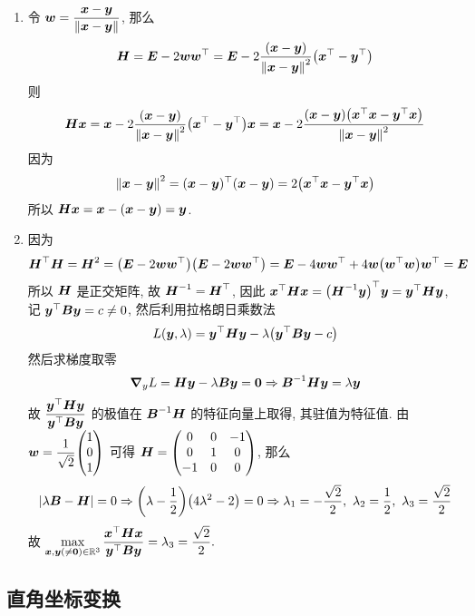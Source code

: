 \begin{solution}
  \begin{enumerate}[label=(\arabic{*})]
    \item 令 $\vb*{w}=\dfrac{\vb*{x}-\vb*{y}}{\norm{\vb*{x}-\vb*{y}}}$, 那么 $$
    \vb*{H}=\vb*{E}-2\vb*{ww}^\top=\vb*{E}-2\dfrac{(\vb*{x}-\vb*{y})}{\norm{\vb*{x}-\vb*{y}}^2}\qty(\vb*{x}^\top-\vb*{y}^\top)
    $$
    则 $$
    \vb*{Hx}=\vb*{x}-2\dfrac{(\vb*{x}-\vb*{y})}{\norm{\vb*{x}-\vb*{y}}^2}\qty(\vb*{x}^\top-\vb*{y}^\top)\vb*{x}=\vb*{x}-2\dfrac{(\vb*{x}-\vb*{y})\qty(\vb*{x}^\top\vb*{x}-\vb*{y}^\top\vb*{x})}{\norm{\vb*{x}-\vb*{y}}^2}
    $$
    因为 $$
    \norm{\vb*{x}-\vb*{y}}^2=(\vb*{x}-\vb*{y})^\top(\vb*{x}-\vb*{y})=2\qty(\vb*{x}^\top\vb*{x}-\vb*{y}^\top\vb*{x})
    $$
    所以 $\vb*{Hx}=\vb*{x}-(\vb*{x}-\vb*{y})=\vb*{y}$.
    \item 因为 $$\vb*{H}^\top\vb*{H}=\vb*{H}^2=\qty(\vb*{E}-2\vb*{ww}^\top)\qty(\vb*{E}-2\vb*{ww}^\top)=\vb*{E}-4\vb*{ww}^\top+4\vb*{w}\qty(\vb*{w}^\top\vb*{w})\vb*{w}^\top=\vb*{E}$$ 所以 $\vb*{H}$ 是正交矩阵, 故 $\vb*{H}^{-1}=\vb*{H}^\top$, 因此
     $\vb*{x}^\top\vb*{Hx}=\qty(\vb*{H}^{-1}\vb*{y})^\top\vb*{y}=\vb*{y}^\top\vb*{Hy}$, 记 $\vb*{y}^\top\vb*{By}=c\neq0$, 然后利用拉格朗日乘数法 $$
     L(\vb*{y},\lambda)=\vb*{y}^\top\vb*{Hy}-\lambda \qty(\vb*{y}^\top\vb*{By}-c)
     $$
     然后求梯度取零 $$
     \grad_y{L}=\vb*{Hy}-\lambda\vb*{By}=\vb*{0}\Rightarrow \vb*{B}^{-1}\vb*{Hy}=\lambda\vb*{y}
     $$
     故 $\displaystyle \dfrac{\vb*{y}^\top\vb*{Hy}}{\vb*{y}^\top\vb*{By}}$ 的极值在 $\vb*{B}^{-1}\vb*{H}$ 的特征向量上取得, 其驻值为特征值.
    由 $\vb*{w}=\dfrac{1}{\sqrt{2}}\mqty(1\\0\\1)$ 可得 $\vb*{H}=\begin{pmatrix} 0 & 0 & -1 \\ 0 & 1 & 0 \\ -1 & 0 & 0 \\\end{pmatrix}$, 那么 $$|\lambda\vb*{B}-\vb*{H}|=0\Rightarrow \qty(\lambda-\dfrac{1}{2})\qty(4\lambda^2-2)=0\Rightarrow\lambda_1=-\dfrac{\sqrt{2}}{2},~\lambda_2=\dfrac{1}{2},~\lambda_3=\dfrac{\sqrt{2}}{2}$$ 故 
     $\displaystyle \max_{\vb*{x},\vb*{y}(\neq\vb*{0})\in \mathbb{R}^{3}}\dfrac{\vb*{x}^\top\vb*{Hx}}{\vb*{y}^\top\vb*{By}}=\lambda_3=\dfrac{\sqrt{2}}{2}.$
  \end{enumerate}
\end{solution}

\subsection{直角坐标变换}

